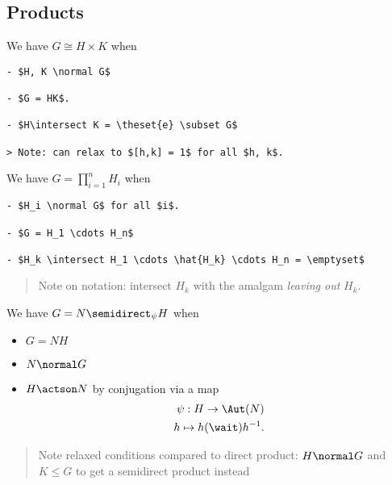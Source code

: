 \hypertarget{products}{%
\subsection{Products}\label{products}}

\begin{theorem}

We have \(G \cong H \times K\) when

\begin{verbatim}
- $H, K \normal G$

- $G = HK$.

- $H\intersect K = \theset{e} \subset G$

> Note: can relax to $[h,k] = 1$ for all $h, k$.
\end{verbatim}

\end{theorem}

\begin{theorem}

We have \(G = \prod_{i=1}^n H_i\) when

\begin{verbatim}
- $H_i \normal G$ for all $i$.

- $G = H_1 \cdots H_n$

- $H_k \intersect H_1 \cdots \hat{H_k} \cdots H_n = \emptyset$
\end{verbatim}

\begin{quote}
Note on notation: intersect \(H_k\) with the amalgam \emph{leaving out}
\(H_k\).
\end{quote}

\end{theorem}

\begin{theorem}

We have \(G = N \semidirect_\psi H\) when

\begin{itemize}
\item
  \(G = NH\)
\item
  \(N \normal G\)
\item
  \(H \actson N\) by conjugation via a map \begin{align*}
  \psi: H \to \Aut(N) \\
  h \mapsto h(\wait)h^{-1}
  .\end{align*}
\end{itemize}

\begin{quote}
Note relaxed conditions compared to direct product: \(H\normal G\) and
\(K\leq G\) to get a semidirect product instead
\end{quote}

\end{theorem}


